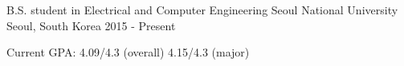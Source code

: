 

\begin{cventries}

  \cventry
    {B.S. student in Electrical and Computer Engineering}
    {Seoul National University} %
    {Seoul, South Korea} %
    {2015 - Present}
    {
      \begin{cvitems} %
        \item {Current GPA: 4.09/4.3 (overall) 4.15/4.3 (major)}
      \end{cvitems}
    }
    
\end{cventries}
